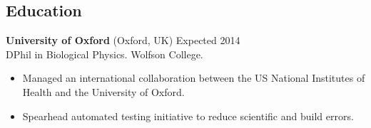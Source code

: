 \documentclass[margin]{res}
\newcommand{\locdatesubsection}[3]{\textbf{#1} (#2) \hfill #3}
\begin{document}
 
\begin{sloppypar}
 
 

\address{2115 Cloville Avenue\\
         Baltimore, MD 21214\\
         \texttt{+}1 443 257 5953}
\address{\texttt{ryan.m.harrison@gmail.com}\\
         \texttt{linkedin.com/in/rmharri}\\
         \texttt{github.com/rmharrison}}
\address{Wolfson College\\ 
         Oxford OX2 6UD\\
         \texttt{+}44 07523 229446}

\begin{resume} 
\setlength{\parskip}{1.00ex}
\setlength{\parindent}{0pt}
 
\section{Education} 
\locdatesubsection{University of Oxford}{Oxford, UK}{Expected 2014}\\
DPhil in Biological Physics. Wolfson College.

\begin{itemize}
\item Managed an international collaboration between the US National Institutes of Health and the University of Oxford.
\item Spearhead automated testing initiative to reduce scientific and build errors.

\end{itemize}


\end{resume}
\end{sloppypar}
\end{document}
